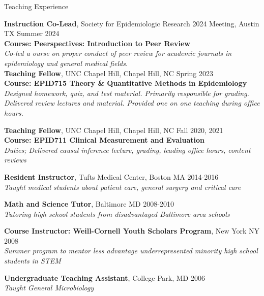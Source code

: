 \documentclass{resume} %
\begin{document}

\begin{rSection}{Teaching Experience}

   {\bf Instruction Co-Lead}{, Society for Epidemiologic Research 2024 Meeting, Austin TX} \hfill {Summer 2024}
   \\ 
   \textbf{Course: Peerspectives: Introduction to Peer Review}
   \\
   \textit{Co-led a ourse on proper conduct of peer review for academic journals in epidemiology and general medical fields.}\\

    {\bf Teaching Fellow}{, UNC Chapel Hill, Chapel Hill, NC} \hfill {Spring 2023}
   \\ 
   \textbf{Course: EPID715 Theory \& Quantitative Methods in Epidemiology}
   \\
   \textit{Designed homework, quiz, and test material. Primarily responsible for grading. Delivered review lectures and material. Provided one on one teaching during office hours.}
   
   {\bf Teaching Fellow}{, UNC Chapel Hill, Chapel Hill, NC} \hfill {Fall 2020, 2021}
   \\
   \textbf{Course: EPID711 Clinical Measurement and Evaluation}
   \\ 
   \textit{Duties; Delivered causal inference lecture, grading, leading office hours, content reviews}

   {\bf Resident Instructor}{, Tufts Medical Center, Boston MA} \hfill {2014-2016}
   \\ 
   \textit{Taught medical students about patient care, general surgery and critical care}
   
   {\bf Math and Science Tutor}{, Baltimore MD} \hfill {2008-2010}
   \\ 
   \textit{Tutoring high school students from disadvantaged Baltimore area schools}
   
   {\bf Course Instructor: Weill-Cornell Youth Scholars Program}{, New York NY} \hfill {2008}
   \\ 
   \textit{Summer program to mentor less advantage underrepresented minority high school students in STEM
   } 
   
   {\bf Undergraduate Teaching Assistant}{, College Park, MD} \hfill {2006}
   \\ 
   \textit{Taught General Microbiology}
   \end{rSection}
   
\end{document}
